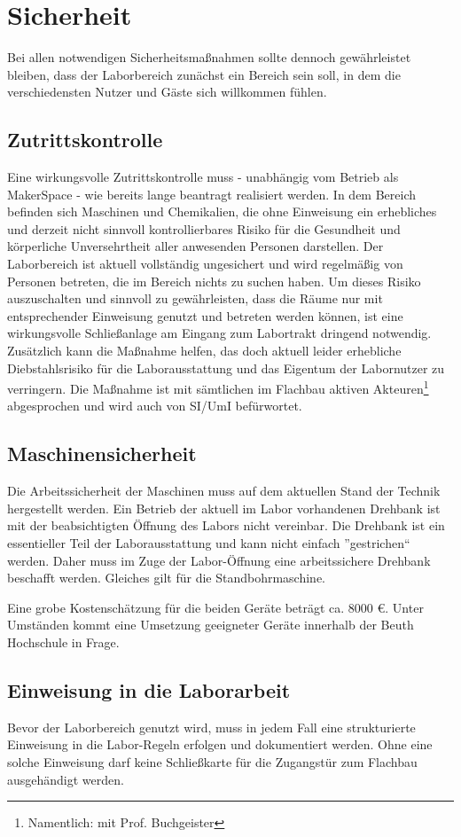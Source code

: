 \documentclass[parskip=half,headsepline,footsepline,titlepage]{scrartcl}
\begin{document}
\section{Sicherheit}
Bei allen notwendigen Sicherheitsmaßnahmen sollte dennoch gewährleistet bleiben, dass der Laborbereich zunächst ein Bereich sein soll, in dem die verschiedensten Nutzer und Gäste sich willkommen fühlen.

\subsection{Zutrittskontrolle}
Eine wirkungsvolle Zutrittskontrolle muss - unabhängig vom Betrieb als MakerSpace - wie bereits lange beantragt realisiert werden. In dem Bereich befinden sich Maschinen und Chemikalien, die ohne Einweisung ein erhebliches und derzeit nicht sinnvoll kontrollierbares Risiko für die Gesundheit und körperliche Unversehrtheit aller anwesenden Personen darstellen. Der Laborbereich ist aktuell vollständig ungesichert und wird regelmäßig von Personen betreten, die im Bereich nichts zu suchen haben. Um dieses Risiko auszuschalten und sinnvoll zu gewährleisten, dass die Räume nur mit entsprechender Einweisung genutzt und betreten werden können, ist eine wirkungsvolle Schließanlage am Eingang zum Labortrakt dringend notwendig. Zusätzlich kann die Maßnahme helfen, das doch aktuell leider erhebliche Diebstahlsrisiko für die Laborausstattung und das Eigentum der Labornutzer zu verringern. Die Maßnahme ist mit sämtlichen im Flachbau aktiven Akteuren\footnote{Namentlich: mit Prof. Buchgeister} abgesprochen und wird auch von SI/UmI befürwortet.

\subsection{Maschinensicherheit}
Die Arbeitssicherheit der Maschinen muss auf dem aktuellen Stand der Technik hergestellt werden.
Ein Betrieb der aktuell im Labor vorhandenen Drehbank ist mit der beabsichtigten Öffnung des Labors nicht vereinbar. Die Drehbank ist ein essentieller Teil der Laborausstattung und kann nicht einfach ''gestrichen`` werden. Daher muss im Zuge der Labor-Öffnung eine arbeitssichere Drehbank beschafft werden. Gleiches gilt für die Standbohrmaschine.

Eine grobe Kostenschätzung für die beiden Geräte beträgt ca. 8000 \euro. Unter Umständen kommt eine Umsetzung geeigneter Geräte innerhalb der Beuth Hochschule in Frage.

\subsection{Einweisung in die Laborarbeit}
Bevor der Laborbereich genutzt wird, muss in jedem Fall eine strukturierte Einweisung in die Labor-Regeln erfolgen und dokumentiert werden. Ohne eine solche Einweisung darf keine Schließkarte für die  Zugangstür zum Flachbau ausgehändigt werden.
\end{document}
